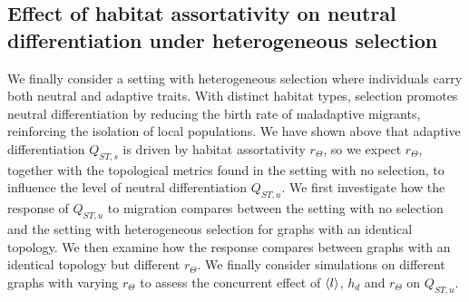 \subsection{Effect of habitat assortativity on neutral differentiation under heterogeneous selection}
%
We finally consider a setting with heterogeneous selection where individuals carry both neutral and adaptive traits. With distinct habitat types, selection promotes neutral differentiation by reducing the birth rate of maladaptive migrants, reinforcing the isolation of local populations. 
%
We have shown above that adaptive differentiation $Q_{ST,s}$ is driven by habitat assortativity $r_\Theta$, so we expect $r_\Theta$, together with the topological metrics found in the setting with no selection, to influence the level of neutral differentiation $Q_{ST,u}$.
%
We first investigate how the response of $Q_{ST,u}$ to migration compares between the setting with no selection and the setting with heterogeneous selection for graphs with an identical topology.
%
We then examine how the response compares between graphs with an identical topology but different $r_\Theta$. We finally consider simulations on different graphs with varying $r_\Theta$ to assess the concurrent effect of $\langle l \rangle$, $h_d$ and $r_\Theta$ on $Q_{ST,u}$.

